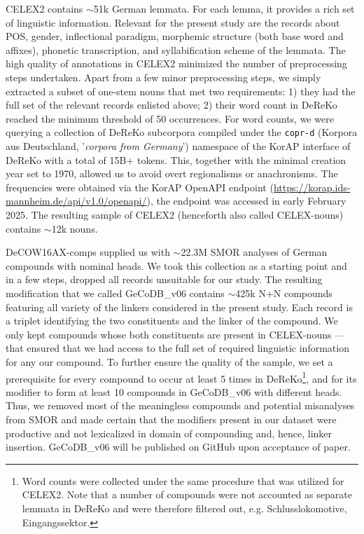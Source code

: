 \documentclass[10pt, a4paper]{article}
\begin{document}
CELEX2 contains $\sim$51k German lemmata. For each lemma, it provides a rich set of linguistic information. Relevant for the present study are the records about POS, gender, inflectional paradigm, morphemic structure (both base word and affixes), phonetic transcription, and syllabification scheme of the lemmata. The high quality of annotations in CELEX2 minimized the number of preprocessing steps undertaken. Apart from a few minor preprocessing steps, we simply extracted a subset of one-stem nouns that met two requirements: 1) they had the full set of the relevant records enlisted above; 2) their word count in DeReKo reached the minimum threshold of 50 occurrences. For word counts, we were querying a collection of DeReKo subcorpora compiled under the \texttt{copr-d} (Korpora aus Deutschland, '\textit{corpora from Germany}') namespace of the KorAP interface of DeReKo with a total of 15B+ tokens. This, together with the minimal creation year set to 1970, allowed us to avoid overt regionalisms or anachronisms. The frequencies were obtained via the KorAP OpenAPI endpoint (\url{https://korap.ids-mannheim.de/api/v1.0/openapi/}), the endpoint was accessed in early February 2025. The resulting sample of CELEX2 (henceforth also called CELEX-nouns) contains $\sim$12k nouns.

DeCOW16AX-comps supplied us with $\sim$22.3M SMOR \citep{schmid_2004} analyses of German compounds with nominal heads. We took this collection as a starting point and in a few steps, dropped all records unsuitable for our study. The resulting modification that we called GeCoDB\_v06 contains $\sim$425k N+N compounds featuring all variety of the linkers considered in the present study. Each record is a triplet identifying the two constituents and the linker of the compound. We only kept compounds whose both constituents are present in CELEX-nouns --- that ensured that we had access to the full set of required linguistic information for any our compound. To further ensure the quality of the sample, we set a prerequisite for every compound to occur at least 5 times in DeReKo\footnote{Word counts were collected under the same procedure that was utilized for CELEX2. Note that a number of compounds were not accounted as separate lemmata in DeReKo and were therefore filtered out, e.g. Schlusslokomotive, Eingangssektor.}, and for its modifier to form at least 10 compounds in GeCoDB\_v06 with different heads. Thus, we removed most of the meaningless compounds and potential misanalyses from SMOR and made certain that the modifiers present in our dataset were productive and not lexicalized in domain of compounding and, hence, linker insertion. GeCoDB\_v06 will be published on GitHub upon acceptance of paper.
\end{document}
